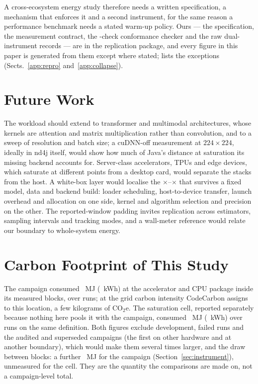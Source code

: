 A cross-ecosystem energy study therefore needs a written specification, a
mechanism that enforces it and a second instrument, for the same reason a
performance benchmark needs a stated warm-up policy. Ours --- the specification,
the measurement contract, the \vConformanceChecks{}-check conformance checker and
the raw dual-instrument records --- are in the replication package, and every
figure in this paper is generated from them except where stated; \ESMname{}
lists the exceptions (Sects.~\ref{app:repro} and~\ref{app:collapse}).

\section{Future Work}
\label{sec:future}

The workload should extend to transformer and multimodal architectures, whose
kernels are attention and matrix multiplication rather than convolution, and to
a sweep of resolution and batch size; a cuDNN-off measurement at
$224\times224$, ideally in nd4j itself, would show how much of Java's distance at
saturation its missing backend accounts for. Server-class accelerators, TPUs and edge devices, which saturate at
different points from a desktop card, would separate the stacks from the host. A
white-box layer would localise the \vCtrlSpreadMin$\times$--\vCtrlSpreadMax$\times$
that survives a fixed model, data and backend build: loader scheduling,
host-to-device transfer, launch overhead and allocation on one side, kernel and
algorithm selection and precision on the other. The reported-window padding
invites replication across estimators, sampling intervals and tracking modes,
and a wall-meter reference would relate our boundary to whole-system energy.


\section{Carbon Footprint of This Study}

The campaign consumed \vCampaignEnergyMJ~MJ (\vCampaignEnergyKWh~kWh) at the
accelerator and CPU package inside its measured blocks, over \vRuns{} runs; at
the grid carbon intensity CodeCarbon assigns to this location, a few kilograms
of CO$_2$e. The saturation cell, reported separately because nothing here pools
it with the campaign, consumed \vSatCampaignEnergyMJ~MJ
(\vSatCampaignEnergyKWh~kWh) over \vSatRuns{} runs on the same definition. Both
figures exclude development, failed runs and the audited and superseded
campaigns (the first on other hardware and at another boundary), which would make them
several times larger, and the draw between blocks: a further \vUntrackedMJ~MJ
for the campaign (Section~\ref{sec:instrument}), unmeasured for the cell. They
are the quantity the comparisons are made on, not a campaign-level total.
